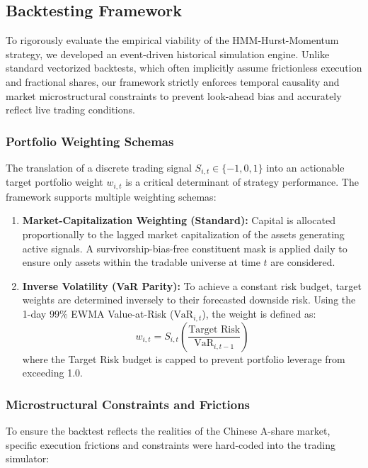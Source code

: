 \documentclass[12pt]{article}
\begin{document}
\subsection{Backtesting Framework}

To rigorously evaluate the empirical viability of the HMM-Hurst-Momentum strategy, we developed an event-driven historical simulation engine. Unlike standard vectorized backtests, which often implicitly assume frictionless execution and fractional shares, our framework strictly enforces temporal causality and market microstructural constraints to prevent look-ahead bias and accurately reflect live trading conditions.

\subsubsection{Portfolio Weighting Schemas}
The translation of a discrete trading signal $S_{i,t} \in \{-1, 0, 1\}$ into an actionable target portfolio weight $w_{i,t}$ is a critical determinant of strategy performance. The framework supports multiple weighting schemas:

\begin{enumerate}
    \item \textbf{Market-Capitalization Weighting (Standard):} Capital is allocated proportionally to the lagged market capitalization of the assets generating active signals. A survivorship-bias-free constituent mask is applied daily to ensure only assets within the tradable universe at time $t$ are considered.
    
    \item \textbf{Inverse Volatility (VaR Parity):} To achieve a constant risk budget, target weights are determined inversely to their forecasted downside risk. Using the 1-day 99\% EWMA Value-at-Risk ($\text{VaR}_{i,t}$), the weight is defined as:
    $$ w_{i,t} = S_{i,t} \left( \frac{\text{Target Risk}}{\text{VaR}_{i,t-1}} \right) $$
    where the Target Risk budget is capped to prevent portfolio leverage from exceeding 1.0.
\end{enumerate}

\subsubsection{Microstructural Constraints and Frictions}
To ensure the backtest reflects the realities of the Chinese A-share market, specific execution frictions and constraints were hard-coded into the trading simulator:
\end{document}

